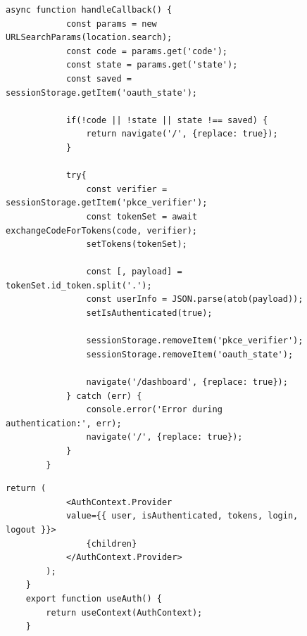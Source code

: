 \begin{figure}[H]
    \begin{lstlisting}[caption=Callback-Handling, breaklines = true, label=list:authcontextcallback2]
        async function handleCallback() {
            const params = new URLSearchParams(location.search);
            const code = params.get('code');
            const state = params.get('state');
            const saved = sessionStorage.getItem('oauth_state');

            if(!code || !state || state !== saved) {
                return navigate('/', {replace: true});
            }

            try{
                const verifier = sessionStorage.getItem('pkce_verifier');
                const tokenSet = await exchangeCodeForTokens(code, verifier);
                setTokens(tokenSet);

                const [, payload] = tokenSet.id_token.split('.');
                const userInfo = JSON.parse(atob(payload));
                setIsAuthenticated(true);

                sessionStorage.removeItem('pkce_verifier');
                sessionStorage.removeItem('oauth_state');

                navigate('/dashboard', {replace: true});
            } catch (err) {
                console.error('Error during authentication:', err);
                navigate('/', {replace: true});
            }
        }
    \end{lstlisting}
\end{figure}

\begin{figure}[H]
    \begin{lstlisting}[caption=AuthProvider-Komponente, breaklines = true, label=list:authcontextprovider]
        return (
            <AuthContext.Provider 
            value={{ user, isAuthenticated, tokens, login, logout }}>
                {children}
            </AuthContext.Provider>
        );
    }
    export function useAuth() {
        return useContext(AuthContext);
    }
    \end{lstlisting}
\end{figure}

